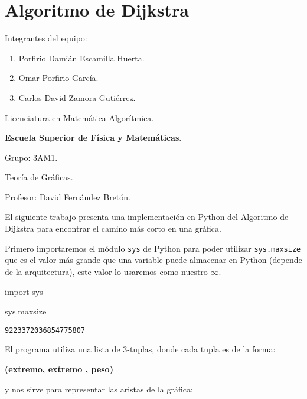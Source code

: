 \documentclass[
]{article}
\author{}
\date{}
\newenvironment{Shaded}{}{}
\newcommand{\ImportTok}[1]{#1}
\newcommand{\NormalTok}[1]{#1}
\providecommand{\tightlist}{%
  \setlength{\itemsep}{0pt}\setlength{\parskip}{0pt}}
\begin{document}
\hypertarget{algoritmo-de-dijkstra}{%
\section{Algoritmo de Dijkstra}\label{algoritmo-de-dijkstra}}

Integrantes del equipo:

\begin{enumerate}
\tightlist
\item
  Porfirio Damián Escamilla Huerta.
\item
  Omar Porfirio García.
\item
  Carlos David Zamora Gutiérrez.
\end{enumerate}

Licenciatura en Matemática Algorítmica.

\textbf{Escuela Superior de Física y Matemáticas}.

Grupo: 3AM1.

Teoría de Gráficas.

Profesor: David Fernández Bretón.

El siguiente trabajo presenta una implementación en Python del Algoritmo
de Dijkstra para encontrar el camino más corto en una gráfica.

Primero importaremos el módulo \texttt{sys} de Python para poder
utilizar \texttt{sys.maxsize} que es el valor más grande que una
variable puede almacenar en Python (depende de la arquitectura), este
valor lo usaremos como nuestro $\infty$.

\begin{Shaded}
\begin{Highlighting}[]
\ImportTok{import}\NormalTok{ sys}
\end{Highlighting}
\end{Shaded}

\begin{Shaded}
\begin{Highlighting}[]
\NormalTok{sys.maxsize}
\end{Highlighting}
\end{Shaded}

\begin{verbatim}
9223372036854775807
\end{verbatim}

El programa utiliza una lista de 3-tuplas, donde cada tupla es de la
forma:

\textbf{(extremo, extremo , peso)}

y nos sirve para representar las aristas de la gráfica:
\end{document}
